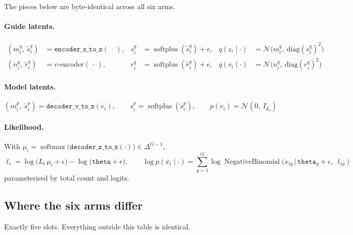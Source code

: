 \documentclass[11pt]{article}
\newcommand{\encxz}{\texttt{encoder\_x\_to\_z}}
\newcommand{\decvz}{\texttt{decoder\_v\_to\_z}}
\newcommand{\deczx}{\texttt{decoder\_z\_to\_x}}
\newcommand{\thetapar}{\texttt{theta}}
\newcommand{\sfp}{\operatorname{softplus}}
\newcommand{\smax}{\operatorname{softmax}}
\newcommand{\NB}{\operatorname{NegativeBinomial}}
\newcommand{\Norm}{\mathcal{N}}
\begin{document}
The pieces below are byte-identical across all six arms.

\paragraph{Guide latents.}
\begin{align}
(m^{q}_i,\ \tilde{s}^{q}_i) &= \encxz(\,\cdot\,), &
s^{q}_i &= \sfp(\tilde{s}^{q}_i) + \epsilon, &
q(z_i\mid\cdot) &= \Norm\!\big(m^{q}_i,\ \mathrm{diag}(s^{q}_i)^2\big) \\
(n^{q}_i,\ \tilde{r}^{q}_i) &= \text{$v$-encoder}(\,\cdot\,), &
r^{q}_i &= \sfp(\tilde{r}^{q}_i) + \epsilon, &
q(v_i\mid\cdot) &= \Norm\!\big(n^{q}_i,\ \mathrm{diag}(r^{q}_i)^2\big)
\end{align}

\paragraph{Model latents.}
\begin{equation}
(m^{p}_i,\ \tilde{s}^{p}_i) = \decvz(v_i), \qquad
s^{p}_i = \sfp(\tilde{s}^{p}_i), \qquad
p(v_i) = \Norm(0,\ I_{d_v})
\end{equation}

\paragraph{Likelihood.} With $\mu_i = \smax\big(\deczx(\cdot)\big) \in \Delta^{G-1}$,
\begin{equation}
\ell_i = \log\!\big(L_i\,\mu_i + \epsilon\big) - \log\!\big(\thetapar + \epsilon\big),
\qquad
\log p(x_i \mid \cdot) = \sum_{g=1}^{G} \log \NB\!\big(x_{ig} \,\big|\, \thetapar_g + \epsilon,\ \ell_{ig}\big)
\end{equation}
parameterised by total count and logits.

\subsection*{Where the six arms differ}

Exactly five slots. Everything outside this table is identical.
\end{document}
